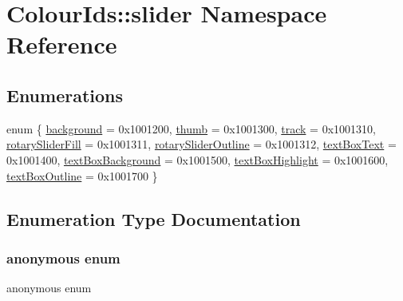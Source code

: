 \hypertarget{namespaceColourIds_1_1slider}{}\section{Colour\+Ids\+:\+:slider Namespace Reference}
\label{namespaceColourIds_1_1slider}
\subsection*{Enumerations}
\begin{DoxyCompactItemize}
\item 
enum \{ \newline
\mbox{\hyperlink{namespaceColourIds_1_1slider_a7e27ae3ad77b5f8564a36fe2ff2cba99a780cab3edf7ac4a7a1af91bdb4660750}{background}} = 0x1001200, 
\mbox{\hyperlink{namespaceColourIds_1_1slider_a7e27ae3ad77b5f8564a36fe2ff2cba99a249a4410d3a5844e96c4e9582b44a7c5}{thumb}} = 0x1001300, 
\mbox{\hyperlink{namespaceColourIds_1_1slider_a7e27ae3ad77b5f8564a36fe2ff2cba99a1cf109199b154f43419923554500f1ca}{track}} = 0x1001310, 
\mbox{\hyperlink{namespaceColourIds_1_1slider_a7e27ae3ad77b5f8564a36fe2ff2cba99aa0c37109abaf4919e46ad74328871299}{rotary\+Slider\+Fill}} = 0x1001311, 
\newline
\mbox{\hyperlink{namespaceColourIds_1_1slider_a7e27ae3ad77b5f8564a36fe2ff2cba99a0c736c231ced89a234dbd63f753d3884}{rotary\+Slider\+Outline}} = 0x1001312, 
\mbox{\hyperlink{namespaceColourIds_1_1slider_a7e27ae3ad77b5f8564a36fe2ff2cba99a9403e26642976c5b5ef55a68b0070241}{text\+Box\+Text}} = 0x1001400, 
\mbox{\hyperlink{namespaceColourIds_1_1slider_a7e27ae3ad77b5f8564a36fe2ff2cba99abcda9be9632f1a4caad02904bfe4f817}{text\+Box\+Background}} = 0x1001500, 
\mbox{\hyperlink{namespaceColourIds_1_1slider_a7e27ae3ad77b5f8564a36fe2ff2cba99a12588eb8800b94b44b23a3e16eb00ac5}{text\+Box\+Highlight}} = 0x1001600, 
\newline
\mbox{\hyperlink{namespaceColourIds_1_1slider_a7e27ae3ad77b5f8564a36fe2ff2cba99a50013c0a1c1afd5e772d0db7240ea3e1}{text\+Box\+Outline}} = 0x1001700
 \}
\end{DoxyCompactItemize}


\subsection{Enumeration Type Documentation}
\mbox{\label{namespaceColourIds_1_1slider_a7e27ae3ad77b5f8564a36fe2ff2cba99}} 
\subsubsection{\texorpdfstring{anonymous enum}{anonymous enum}}
{\footnotesize\ttfamily anonymous enum}

